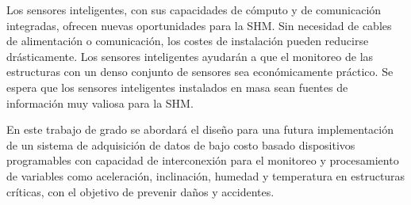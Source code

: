 Los sensores inteligentes, con sus capacidades de cómputo y de comunicación integradas, ofrecen nuevas oportunidades para la SHM. Sin necesidad de cables de alimentación o comunicación, los costes de instalación pueden reducirse drásticamente. Los sensores inteligentes ayudarán a que el monitoreo de las estructuras con un denso conjunto de sensores sea económicamente práctico. Se espera que los sensores inteligentes instalados en masa sean fuentes de información muy valiosa para la SHM.

En este trabajo de grado se abordará el diseño para una futura implementación de un sistema de adquisición de datos de bajo costo basado dispositivos programables con capacidad de interconexión para el monitoreo y procesamiento de variables como aceleración, inclinación, humedad y temperatura en estructuras críticas, con el objetivo de prevenir daños y accidentes.
